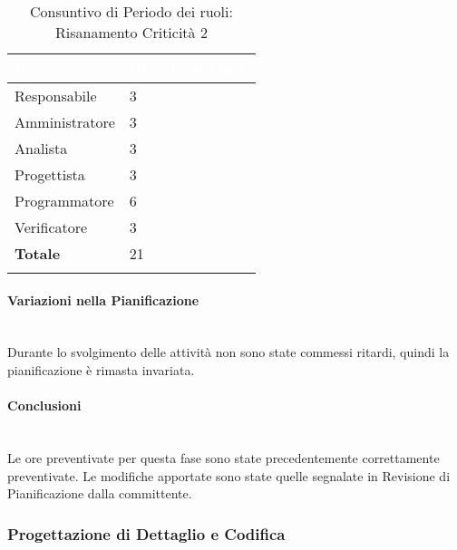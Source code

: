 \begin{longtable}{| C{.30\textwidth}| C{.15\textwidth}| C{.20\textwidth}|}
	\hline
	\textbf{\textcolor{white}{Ruolo}} & \textbf{\textcolor{white}{Ore}} & \textbf{\textcolor{white}{Costo 	in \euro}} \\
	\hline 
	Responsabile & 3 &  \\
	\hline
	Amministratore & 3 &  \\
	\hline
	Analista & 3 &  \\
	\hline
	Progettista & 3 & \\
	\hline
	Programmatore & 6 &  \\
	\hline 
	Verificatore & 3 &  \\
	\hline
	\textbf{Totale} & 21 &  \\
	\hline 

\caption{Consuntivo di Periodo dei ruoli: Risanamento Criticità 2}
\label{Distribuzione ruoli RC2}
\end{longtable}

\paragraph{Variazioni nella Pianificazione} ~\\
Durante lo svolgimento delle attività non sono state commessi ritardi, quindi la pianificazione è rimasta invariata.

\paragraph{Conclusioni} ~\\

Le ore preventivate per questa fase sono state precedentemente correttamente preventivate. Le modifiche apportate sono state quelle segnalate in Revisione di Pianificazione dalla committente. 

\pagebreak

\subsubsection{Progettazione di Dettaglio e Codifica}
\label{PPDC}
